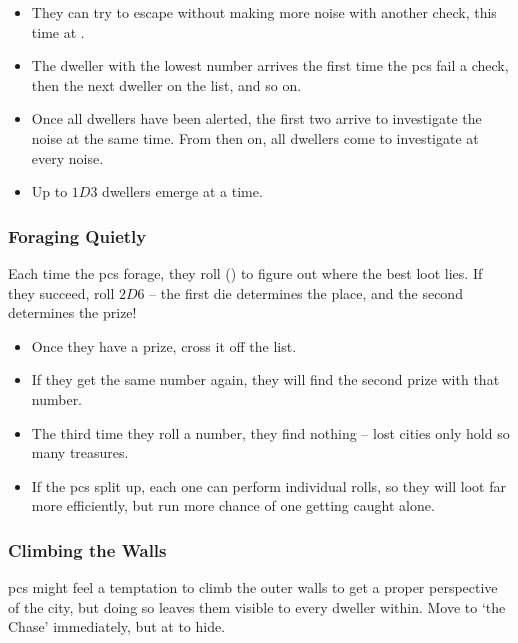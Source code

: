 \begin{multicols}{2}
\begin{itemize}
  \item
  They can try to escape without making more noise with another  check, this time at \tn[10].
  \item
  The dweller with the lowest number arrives the first time the \glspl{pc} fail a check, then the next dweller on the list, and so on.
  \item
  Once all dwellers have been alerted, the first two arrive to investigate the noise at the same time.
  From then on, all dwellers come to investigate at every noise.
  \item
  Up to $1D3$ dwellers emerge at a time.
\end{itemize}

\subsubsection{Foraging Quietly}
\label{lostForaging}

Each time the \glspl{pc} forage, they roll  (\tn[12]) to figure out where the best loot lies.
If they succeed, roll $2D6$ -- the first die determines the place, and the second determines the prize!

\begin{itemize}
  \item
  Once they have a prize, cross it off the list.
  \item
  If they get the same number again, they will find the second prize with that number.
  \item
  The third time they roll a number, they find nothing -- lost cities only hold so many treasures.
  \item
  If the \glspl{pc} split up, each one can perform individual rolls, so they will loot far more efficiently, but run more chance of one getting caught alone.

\end{itemize}

\subsubsection{Climbing the Walls}

\Glspl{pc} might feel a temptation to climb the outer walls to get a proper perspective of the city, but doing so leaves them visible to every dweller within.
Move to `the Chase' immediately, but at \tn[12] to hide.

\end{multicols}

\foragingChart

\needspace{12em}
\bigLine

\begin{multicols}{2}

\jelly

\jelly

\griffin

\chitincrawler

\demilich

\dragon

\end{multicols}
